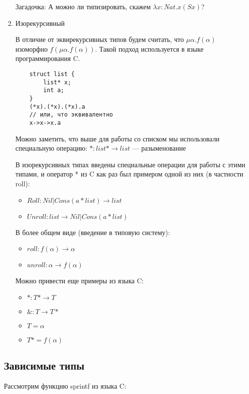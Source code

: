 \begin{enumerate}
    Загадочка: А можно ли типизировать, скажем $\lambda x : Nat. x (S x)$?
    \item Изорекурсивный

    В отличие от эквирекурсивных типов будем считать, что $\mu \alpha. f(\alpha)$ изоморфно $f(\mu \alpha.f(\alpha))$. Такой подход используется в языке программирования C.
    \begin{verbatim}
    struct list {
        list* x;
        int a;
    }
    (*x).(*x).(*x).a
    // или, что эквивалентно
    x->x->x.a
    \end{verbatim}

    Можно заметить, что выше для работы со списком мы использовали специальную операцию:
    $*: list* \rightarrow list$ --- разыменование

    В изорекурсивных типах введены специальные операции для работы с этими типами, и оператор * из C как раз был примером одной из них (в частности roll):
    \begin{itemize}
        \item $Roll: Nil | Cons (a * list) \rightarrow list$
        \item $Unroll: list \rightarrow Nil | Cons (a * list)$
    \end{itemize}

    В более общем виде (введение в типовую систему):
    \begin{itemize}
        \item $roll: f(\alpha) \rightarrow \alpha$
        \item $unroll: \alpha \rightarrow f(\alpha)$
    \end{itemize}

    Можно привести еще примеры из языка C:
    \begin{itemize}
        \item $*: T* \rightarrow T$
        \item $\&: T \rightarrow T*$
        \item $T = \alpha$
        \item $T* = f(\alpha)$
    \end{itemize}

\end{enumerate}

\subsection{Зависимые типы}

Рассмотрим функцию sprintf из языка C:

